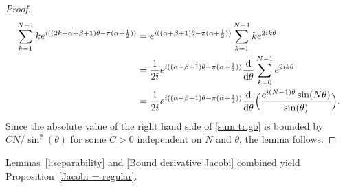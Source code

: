 \documentclass[a4paper,11pt]{article}
\numberwithin{equation}{section}
\theoremstyle{definition}
\renewcommand{\d}{ {\rm d}}
\begin{document}
\begin{proof}
\begin{align}
\label{sum trigo}
\sum_{k=1}^{N-1} k e^{i((2k+\alpha+\beta+1)\theta-\pi(\alpha +\frac12))}
& =e^{i((\alpha+\beta+1)\theta-\pi(\alpha +\frac12))}\sum_{k=1}^{N-1} k e^{2ik\theta} \nonumber\\
&= \frac{1}{2i}e^{i((\alpha+\beta+1)\theta-\pi(\alpha +\frac12))}\frac{\d}{\d\theta}\sum_{k=0}^{N-1} e^{2ik\theta}\nonumber\\
&= \frac{1}{2i}e^{i((\alpha+\beta+1)\theta-\pi(\alpha +\frac12))}\frac{\d}{\d\theta}\Big(\frac{e^{i(N-1)\theta}\sin (N\theta)}{\sin(\theta)}\Big).
\end{align}
Since the absolute value of the right hand side of \eqref{sum trigo} is bounded by $CN/\sin^2(\theta)$ for some $C>0$ independent on $N$ and $\theta$, the lemma follows.

\end{proof}

Lemmas~\ref{l:separability} and \ref{Bound derivative Jacobi} combined yield
Proposition~\ref{Jacobi = regular}.
\end{document}
